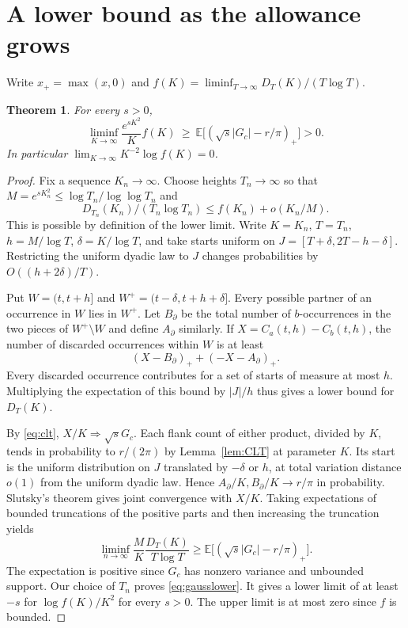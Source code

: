 \documentclass[11pt]{article}
\newtheorem{theorem}{Theorem}[section]
\newcommand{\E}{\mathbb E}
\begin{document}
\section{A lower bound as the allowance grows}

Write \(x_+=\max(x,0)\) and \(f(K)=\liminf_{T\to\infty}D_T(K)/(T\log T)\).
\begin{theorem}\label{th:tails}
For every \(s>0\),
\begin{equation}\label{eq:gausslower}
 \liminf_{K\to\infty}\frac{e^{sK^2}}K f(K)
 \ \ge\ \E\bigl[(\sqrt{s}|G_c|-r/\pi)_+\bigr]>0 .
\end{equation}
In particular \(\lim_{K\to\infty}K^{-2}\log f(K)=0\).
\end{theorem}

\begin{proof}
Fix a sequence \(K_n\to\infty\). Choose heights \(T_n\to\infty\) so
that \(M=e^{sK_n^2}\le\log T_n/\log\log T_n\) and
\[
 D_{T_n}(K_n)/(T_n\log T_n)\le f(K_n)+o(K_n/M).
\]
This is possible by definition of the lower limit. Write \(K=K_n\),
\(T=T_n\), \(h=M/\log T\), \(\delta=K/\log T\), and take starts uniform
on \(J=[T+\delta,2T-h-\delta]\). Restricting the uniform dyadic law to \(J\)
changes probabilities by \(O((h+2\delta)/T)\).

Put \(W=(t,t+h]\) and \(W^+=(t-\delta,t+h+\delta]\).
Every possible partner of an occurrence in \(W\) lies in \(W^+\).
Let \(B_\partial\) be the total number of \(b\)-occurrences in the two
pieces of \(W^+\setminus W\) and define \(A_\partial\) similarly. If
\(X=C_a(t,h)-C_b(t,h)\), the number of discarded occurrences within \(W\)
is at least
\[
 (X-B_\partial)_+ +(-X-A_\partial)_+ .
\]
Every discarded occurrence contributes for a set of starts of measure at
most \(h\). Multiplying the expectation of this bound by
\(|J|/h\) thus gives a lower bound for \(D_T(K)\).

By \eqref{eq:clt}, \(X/K\Longrightarrow\sqrt{s}G_c\). Each flank count
of either product, divided by \(K\), tends in probability to \(r/(2\pi)\)
by Lemma~\ref{lem:CLT} at parameter \(K\). Its start is the uniform
distribution on \(J\) translated by \(-\delta\) or \(h\), at total variation
distance \(o(1)\) from the uniform dyadic law.
Hence \(A_\partial/K,B_\partial/K\to r/\pi\) in probability.
Slutsky's theorem gives joint convergence with \(X/K\).
Taking expectations of bounded truncations of the positive parts and then
increasing the truncation yields
\[
 \liminf_{n\to\infty}\frac{M}{K}\frac{D_T(K)}{T\log T}
 \ge \E\bigl[(\sqrt{s}|G_c|-r/\pi)_+\bigr].
\]
The expectation is positive since \(G_c\) has nonzero variance and unbounded
support. Our choice of \(T_n\) proves \eqref{eq:gausslower}. It gives a
lower limit of at least \(-s\) for \(\log f(K)/K^2\) for every \(s>0\).
The upper limit is at most zero since \(f\) is bounded.
\end{proof}
\end{document}
